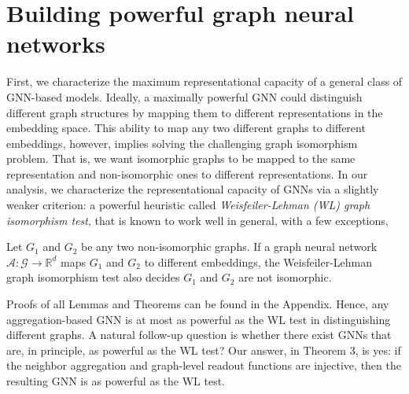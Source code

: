 
\section{Building powerful graph neural networks} 

\label{sec:method}

First, we characterize the maximum representational capacity of a general class of GNN-based models. Ideally, a maximally powerful GNN could distinguish different graph structures by mapping them to different representations in the embedding space.
This ability to map any two different graphs to different embeddings, however, implies solving the challenging graph isomorphism problem. That is, we want isomorphic graphs to be mapped to the same representation and non-isomorphic ones to different representations. In our analysis, we characterize the representational capacity of GNNs via a slightly weaker criterion: a powerful heuristic called {\em Weisfeiler-Lehman (WL) graph isomorphism test}, that is known to work well in general, with a few exceptions,  

\begin{lemma}
\label{theorem:upper}
Let $G_1$ and $G_2$ be any two non-isomorphic graphs. If a graph neural network $\mathcal{A}: \mathcal{G} \rightarrow \mathbb{R}^d$ 
maps $G_1$ and $G_2$ to different embeddings, the Weisfeiler-Lehman graph isomorphism test also decides $G_1$ and $G_2$ are not isomorphic. 
\end{lemma}
\vspace{-0.05in}
Proofs of all Lemmas and Theorems can be found in the Appendix.
Hence, %
any aggregation-based GNN is at most as powerful as the WL test in distinguishing different graphs. A natural follow-up question is whether there exist GNNs that are, in principle, as powerful as the WL test? Our answer, in Theorem 3, is yes: if the neighbor aggregation and graph-level readout functions are injective, then the resulting GNN is as powerful as the WL test.

